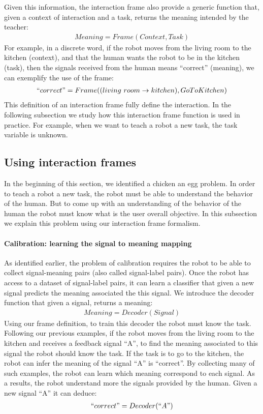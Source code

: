 Given this information, the interaction frame also provide a generic function that, given a context of interaction and a task, returns the meaning intended by the teacher:
%
\begin{eqnarray}
Meaning = Frame(Context, Task) \nonumber
\end{eqnarray}
%
For example, in a discrete word, if the robot moves from the living room to the kitchen (context), and that the human wants the robot to be in the kitchen (task), then the signals received from the human means ``correct'' (meaning), we can exemplify the use of the frame:
%
\begin{eqnarray}
``correct" = Frame((living~room \rightarrow kitchen), Go To Kitchen) \nonumber
\end{eqnarray}
%
This definition of an interaction frame fully define the interaction. In the following subsection we study how this interaction frame function is used in practice. For example, when we want to teach a robot a new task, the task variable is unknown.

\subsection{Using interaction frames}

In the beginning of this section, we identified a chicken an egg problem. In order to teach a robot a new task, the robot must be able to understand the behavior of the human. But to come up with an understanding of the behavior of the human the robot must know what is the user overall objective. In this subsection we explain this problem using our interaction frame formalism.

\paragraph{Calibration: learning the signal to meaning mapping}

As identified earlier, the problem of calibration requires the robot to be able to collect signal-meaning pairs (also called signal-label pairs). Once the robot has access to a dataset of signal-label pairs, it can learn a classifier that given a new signal predicts the meaning associated the this signal. We introduce the decoder function that given a signal, returns a meaning:
%
\begin{eqnarray}
    Meaning = Decoder(Signal) \nonumber
\end{eqnarray}
%
Using our frame definition, to train this decoder the robot must know the task. Following our previous examples, if the robot moves from the living room to the kitchen and receives a feedback signal ``A'', to find the meaning associated to this signal the robot should know the task. If the task is to go to the kitchen, the robot can infer the meaning of the signal ``A'' is ``correct''. By collecting many of such examples, the robot can learn which meaning correspond to each signal. As a results, the robot understand more the signals provided by the human. Given a new signal ``A'' it can deduce:
%
\begin{eqnarray}
    ``correct" = Decoder(``A") \nonumber
\end{eqnarray}

